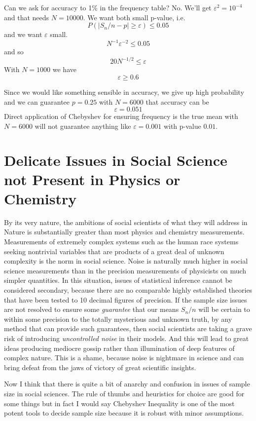 \documentclass{amsart}
\begin{document}
Can we ask for accuracy to 1\% in the frequency table?  No.  We'll get $\varepsilon^2 = 10^{-4}$ and that needs $N=10000$.  We want both small p-value, i.e. 
\[
P( | S_n/n - p | \ge \varepsilon) \le 0.05
\]
and we want $\varepsilon$ small.
\[
N^{-1}\varepsilon^{-2}
\le 0.05
\]
and so
\[
20 N^{-1/2} \le \varepsilon
\]
With $N=1000$ we have 
\[
\varepsilon \ge 0.6 
\]

Since we would like something sensible in accuracy, we give up high probability and we can guarantee $p=0.25$ with $N=6000$ that accuracy can be
\[
\varepsilon = 0.051
\]
Direct application of Chebyshev for ensuring frequency is the true mean with $N=6000$ will not guarantee anything like $\varepsilon=0.001$ with p-value $0.01$.  

\section{Delicate Issues in Social Science not Present in Physics or Chemistry}

By its very nature, the ambitions of social scientists of what they will address in Nature is substantially greater than most physics and chemistry measurements.  Measurements of extremely complex systems such as the human race systems seeking nontrivial variables that are products of a great deal of unknown complexity is the norm in social science.  Noise is naturally much higher in social science measurements than in the precision measurements of physicists on much simpler quantities.  In this situation, issues of statistical inference cannot be considered secondary, because there are no comparable highly established theories that have been tested to 10 decimal figures of precision.  If the sample size issues are not resolved to ensure some {\em guarantee} that our means $S_n/n$ will be certain to within some precision to the totally mysterious and unknown truth, by any method that can provide such guarantees, then social scientists are taking a grave risk of introducing {\em uncontrolled noise} in their models.  And this will lead to great ideas producing mediocre gossip rather than illumination of deep features of complex nature.  This is a shame, because noise is nightmare in science and can bring defeat from the jaws of victory of great scientific insights.  

Now I think that there is quite a bit of anarchy and confusion in issues of sample size in social sciences.  The rule of thumbs and heuristics for choice are good for some things but in fact I would say Chebyshev Inequality is one of the most potent tools to decide sample size because it is robust with minor assumptions.
\end{document}
